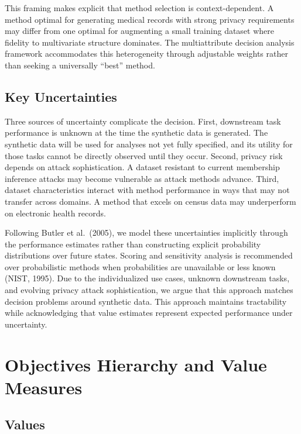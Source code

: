 \documentclass[12pt,a4paper]{article}
\begin{document}
This framing makes explicit that method selection is context-dependent. A method optimal for generating medical records with strong privacy requirements may differ from one optimal for augmenting a small training dataset where fidelity to multivariate structure dominates. The multiattribute decision analysis framework accommodates this heterogeneity through adjustable weights rather than seeking a universally ``best'' method.

\subsection{Key Uncertainties}

Three sources of uncertainty complicate the decision. First, downstream task performance is unknown at the time the synthetic data is generated. The synthetic data will be used for analyses not yet fully specified, and its utility for those tasks cannot be directly observed until they occur. Second, privacy risk depends on attack sophistication. A dataset resistant to current membership inference attacks may become vulnerable as attack methods advance. Third, dataset characteristics interact with method performance in ways that may not transfer across domains. A method that excels on census data may underperform on electronic health records.

Following Butler et al.\ (2005), we model these uncertainties implicitly through the performance estimates rather than constructing explicit probability distributions over future states. Scoring and sensitivity analysis is recommended over probabilistic methods when probabilities are unavailable or less known (NIST, 1995). Due to the individualized use cases, unknown downstream tasks, and evolving privacy attack sophistication, we argue that this approach matches decision problems around synthetic data. This approach maintains tractability while acknowledging that value estimates represent expected performance under uncertainty.

\section{Objectives Hierarchy and Value Measures}

\subsection{Values}
\end{document}
